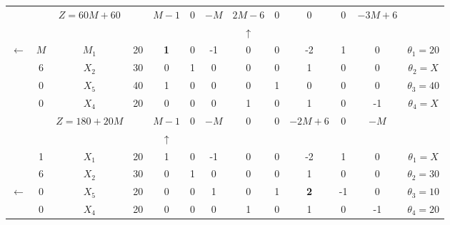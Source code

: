 \begin{tabular}{ccccccccccccc}
\cline{2-13}            &         & $Z=60M+60$ &         & $M-1$   & 0       & $-M$    & \textcolor[rgb]{ 0,  .439,  .753}{\boldmath{}\textbf{$2M-6$}\unboldmath{}} & 0       & 0       & 0       & $-3M+6$ &  \bigstrut\\
\cline{2-13}            &         &         &         &         &         &         & $\uparrow$ &         &         &         &         &  \bigstrut\\
\cline{2-13}    $\leftarrow$ & $M$     & \textcolor[rgb]{ 1,  0,  0}{\boldmath{}\textbf{$M_1$}\unboldmath{}} & 20      & \textbf{1} & 0       & -1      & 0       & 0       & -2      & 1       & 0       & \boldmath{}\textbf{$\theta_1 = 20$}\unboldmath{} \bigstrut[t]\\
            & 6       & $X_2$   & 30      & 0       & 1       & 0       & 0       & 0       & 1       & 0       & 0       & $\theta_2 = X$ \\
            & 0       & $X_5$   & 40      & 1       & 0       & 0       & 0       & 1       & 0       & 0       & 0       & $\theta_3 = 40$ \\
            & 0       & $X_4$   & 20      & 0       & 0       & 0       & 1       & 0       & 1       & 0       & -1      & $\theta_4 = X$ \bigstrut[b]\\
\cline{2-13}            &         & $Z=180+20M$ &         & \textcolor[rgb]{ 0,  .439,  .753}{\boldmath{}\textbf{$M-1$}\unboldmath{}} & 0       & $-M$    & 0       & 0       & $-2M+6$ & 0       & $-M$    &  \bigstrut\\
\cline{2-13}            &         &         &         & $\uparrow$ &         &         &         &         &         &         &         &  \bigstrut\\
\cline{2-13}            & 1       & $X_1$   & 20      & 1       & 0       & -1      & 0       & 0       & -2      & 1       & 0       & $\theta_1 = X$ \bigstrut[t]\\
            & 6       & $X_2$   & 30      & 0       & 1       & 0       & 0       & 0       & 1       & 0       & 0       & $\theta_2 = 30$ \\
    $\leftarrow$ & 0       & \textcolor[rgb]{ 1,  0,  0}{\boldmath{}\textbf{$X_5$}\unboldmath{}} & 20      & 0       & 0       & 1       & 0       & 1       & \textbf{2} & -1      & 0       & \boldmath{}\textbf{$\theta_3 = 10$}\unboldmath{} \\
            & 0       & $X_4$   & 20      & 0       & 0       & 0       & 1       & 0       & 1       & 0       & -1      & $\theta_4 = 20$ \bigstrut[b]\\

\end{tabular}
